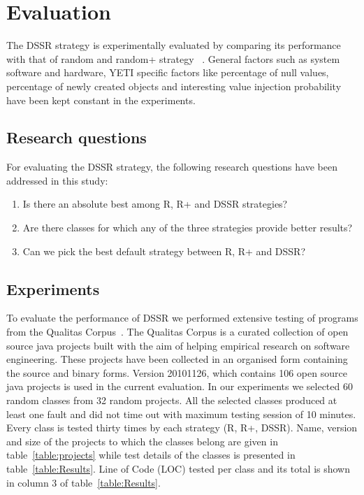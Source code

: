 \documentclass[conference]{IEEEtran}
\begin{document}


\section{Evaluation}\label{sec:eval}

The DSSR strategy is experimentally evaluated by comparing its performance with that of random and random+ strategy ~\cite{Leitner2007}. General factors such as system software and hardware, YETI specific factors like percentage of null values, percentage of newly created objects and interesting value injection probability have been kept constant in the experiments.

\subsection{Research questions}
For evaluating the DSSR strategy, the following research questions have been addressed in this study:
\begin{enumerate}
\item Is there an absolute best among R, R+ and DSSR strategies?
\item Are there classes for which any of the three strategies provide better results?
\item Can we pick the best default strategy between R, R+ and DSSR?
\end{enumerate}



\subsection{Experiments}

To evaluate the performance of DSSR we performed extensive testing of programs from the Qualitas Corpus~\cite{Tempero2010a}. The Qualitas Corpus is a curated collection of open source java projects built with the aim of helping empirical research on  software engineering. These projects have been collected in an organised form containing the source and binary forms. Version 20101126, which contains 106 open source java projects is used in the current evaluation. In our experiments we selected 60 random classes from 32 random projects. All the selected classes produced at least one fault and did not time out with maximum testing session of 10 minutes. Every class is tested thirty times by each strategy (R, R+, DSSR). Name, version and size of the projects to which the classes belong are given in table~\ref{table:projects} while test details of the classes is presented in table~\ref{table:Results}. Line of Code (LOC) tested per class and its total is shown in column 3 of table~\ref{table:Results}. 
\end{document}
